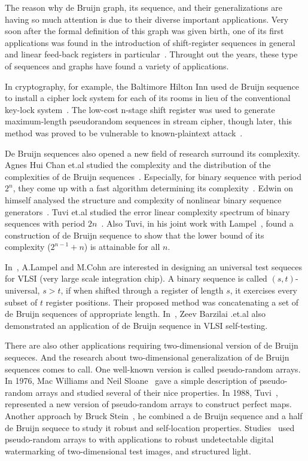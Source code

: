 The reason why de Bruijn graph, its sequence, and their generalizations are having so much attention is due to their diverse important applications. Very soon after the formal definition of this graph was given birth, one of its first applications was found in the introduction of shift-register sequences in general and linear feed-back registers in particular~\cite{golomb19821967}. Throught out the years, these type of sequences and graphs have found a variety of applications.

In cryptography, for example, the Baltimore Hilton Inn used de Bruijn sequence to install a cipher lock system for each of its rooms in lieu of the conventional key-lock system~\cite{fredricksen1982survey}. The low-cost n-stage shift register was used to generate maximum-length pseudorandom sequences in stream cipher, though later, this method was proved to be vulnerable to known-plaintext attack~\cite{lempel1979cryptology}.

De Bruijn sequences also opened a new field of research surround its complexity. Agnes Hui Chan et.al studied the complexity and the distribution of the complexities of de Bruijn sequences~\cite{chan1982complexities}. Especially, for binary sequence with period $2^n$, they come up with a fast algorithm determining its complexity~\cite{games1983fast}. Edwin on himself analysed the structure and complexity of nonlinear binary sequence generators~\cite{key1976analysis}. Tuvi et.al studied the error linear complexity spectrum of binary sequences with period $2n$~\cite{etzion2009properties}. Also Tuvi, in his joint work with Lampel~\cite{etzion1984construction}, found a construction of de Bruijn sequence to show that the lower bound of its complexity ($2^{n-1}+n$) is attainable for all $n$.

In~\cite{lempel1985design}, A.Lampel and M.Cohn are interested in designing an universal test sequeces for VLSI (very large scale integration chip). A binary sequence is called $(s,t)$-universal, $s>t$, if when shifted through a register of length $s$, it exercises every subset of $t$ register positions. Their proposed method was concatenating a set of de Bruijn sequences of appropriate length. In~\cite{barzilai1983exhaustive}, Zeev Barzilai .et.al also demonstrated an application of de Bruijn sequence in VLSI self-testing.

There are also other applications requiring two-dimensional version of de Bruijn sequeces. And the research about two-dimensional generalization of de Bruijn sequences comes to call. One well-known version is called pseudo-random arrays. In 1976, Mac Williams and Neil Sloane~\cite{macwilliams1976pseudo} gave a simple description of pseudo-random arrays and studied several of their nice properties. In 1988, Tuvi~\cite{etzion1988constructions}, represented a new version of pseudo-random arrays to construct perfect maps. Another approach by Bruck Stein~\cite{bruckstein2012simple}, he combined a de Bruijn sequence and a half de Bruijn sequece to study it robust and self-location properties. Studies~\cite{hsieh2001decoding,morano1998structured,pages2005optimised,salvi2010state,van1994digital} used pseudo-random arrays to with applications to robust undetectable digital watermarking of two-dimensional test images, and structured light. 

